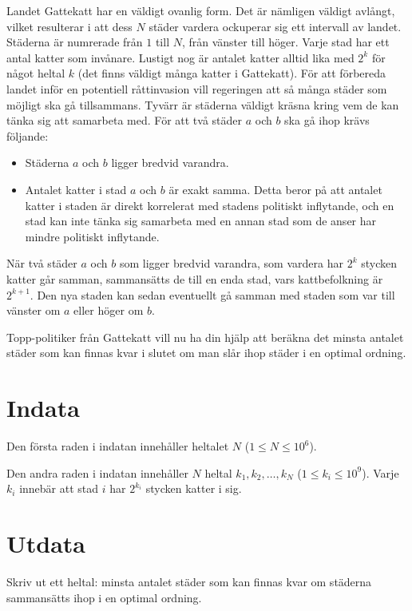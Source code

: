 \noindent
Landet Gattekatt har en väldigt ovanlig form. Det är nämligen väldigt avlångt, vilket resulterar i att dess $N$ städer
vardera ockuperar sig ett intervall av landet.
Städerna är numrerade från $1$ till $N$, från vänster till höger. Varje stad har ett antal katter som invånare. Lustigt nog är
antalet katter alltid lika med $2^k$ för något heltal $k$ (det finns väldigt många katter i Gattekatt).
För att förbereda landet inför en potentiell råttinvasion vill regeringen att så många städer som möjligt ska gå tillsammans.
Tyvärr är städerna väldigt kräsna kring vem de kan tänka sig att samarbeta med. För att två städer $a$ och $b$ ska gå ihop krävs följande:
\begin{itemize}
  \item Städerna $a$ och $b$ ligger bredvid varandra. 
  \item Antalet katter i stad $a$ och $b$ är exakt samma. Detta beror på att antalet katter i staden är direkt korrelerat med stadens
  politiskt inflytande, och en stad kan inte tänka sig samarbeta med en annan stad som de anser har mindre politiskt inflytande.
\end{itemize}

När två städer $a$ och $b$ som ligger bredvid varandra, som vardera har $2^k$ stycken katter går samman, sammansätts de till en enda stad, vars kattbefolkning är $2^{k+1}$.
Den nya staden kan sedan eventuellt gå samman med staden som var till vänster om $a$ eller höger om $b$.

Topp-politiker från Gattekatt vill nu ha din hjälp att beräkna det minsta antalet städer som kan finnas kvar i slutet om man
slår ihop städer i en optimal ordning. 


\section*{Indata}
Den första raden i indatan innehåller heltalet $N$ ($1 \leq N \leq 10^6$).

Den andra raden i indatan innehåller $N$ heltal $k_1,k_2,\dots,k_N$ ($1 \leq k_i \leq 10^9$).
Varje $k_i$ innebär att stad $i$ har $2^{k_i}$ stycken katter i sig. 

\section*{Utdata}
Skriv ut ett heltal: minsta antalet städer som kan finnas kvar om städerna sammansätts ihop i en optimal ordning.


